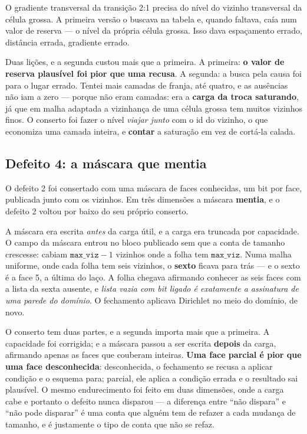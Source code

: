 O gradiente transversal da transição 2:1 precisa do nível do vizinho transversal
da célula grossa. A primeira versão o buscava na tabela e, quando faltava, caía
num valor de reserva --- o nível da própria célula grossa. Isso dava espaçamento
errado, distância errada, gradiente errado.

Duas lições, e a segunda custou mais que a primeira. A primeira: \textbf{o valor
de reserva plausível foi pior que uma recusa}. A segunda: a busca pela causa foi
para o lugar errado. Tentei mais camadas de franja, até quatro, e as ausências não
iam a zero --- porque não eram camadas: era a \textbf{carga da troca saturando},
já que em malha adaptada a vizinhança de uma célula grossa tem muitos vizinhos
finos. O conserto foi fazer o nível \emph{viajar junto} com o id do vizinho, o que
economiza uma camada inteira, e \textbf{contar} a saturação em vez de cortá-la
calada.

\subsection{Defeito 4: a máscara que mentia}

O defeito 2 foi consertado com uma máscara de faces conhecidas, um bit por face,
publicada junto com os vizinhos. Em três dimensões a máscara \textbf{mentia}, e
o defeito 2 voltou por baixo do seu próprio conserto.

A máscara era escrita \emph{antes} da carga útil, e a carga era truncada por
capacidade. O campo da máscara entrou no bloco publicado sem que a conta de
tamanho crescesse: cabiam $\mathtt{max\_viz}-1$ vizinhos onde a folha tem
$\mathtt{max\_viz}$. Numa malha uniforme, onde cada folha tem seis vizinhos, o
\textbf{sexto} ficava para trás --- e o sexto é a face 5, a última do laço. A
folha chegava afirmando conhecer as seis faces com a lista da sexta ausente, e
\emph{lista vazia com bit ligado é exatamente a assinatura de uma parede do
domínio}. O fechamento aplicava Dirichlet no meio do domínio, de novo.

O conserto tem duas partes, e a segunda importa mais que a primeira. A capacidade
foi corrigida; e a máscara passou a ser escrita \textbf{depois} da carga,
afirmando apenas as faces que couberam inteiras. \textbf{Uma face parcial é pior
que uma face desconhecida}: desconhecida, o fechamento se recusa a aplicar
condição e o esquema para; parcial, ele aplica a condição errada e o resultado
sai plausível. O mesmo endurecimento foi feito em duas dimensões, onde a carga
cabe e portanto o defeito nunca disparou --- a diferença entre ``não dispara'' e
``não pode disparar'' é uma conta que alguém tem de refazer a cada mudança de
tamanho, e é justamente o tipo de conta que não se refaz.

